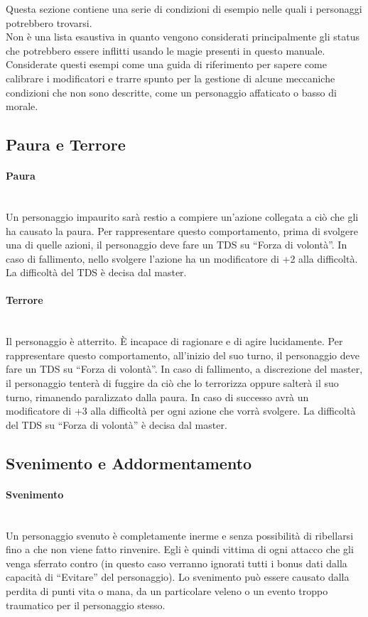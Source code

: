 \documentclass[../manuale_main.tex]{subfiles}
\begin{document}
Questa sezione contiene una serie di condizioni di esempio nelle quali i personaggi potrebbero trovarsi.\\
Non è una lista esaustiva in quanto vengono considerati principalmente gli status che potrebbero essere inflitti usando le magie presenti in questo manuale. Considerate questi esempi come una guida di riferimento per sapere come calibrare i modificatori e trarre spunto per la gestione di alcune meccaniche condizioni che non sono descritte, come un personaggio affaticato o basso di morale.\\

\subsection{Paura e Terrore} 
\paragraph{Paura}\mbox{}\\
Un personaggio impaurito sarà restio a compiere un’azione collegata a ciò che gli ha causato la paura. Per rappresentare questo comportamento, prima di svolgere una di quelle azioni, il personaggio deve fare un TDS su “Forza di volontà”. In caso di fallimento, nello svolgere l’azione ha un modificatore di +2 alla difficoltà. La difficoltà del TDS è decisa dal master.
\paragraph{Terrore}\mbox{}\\
Il personaggio è atterrito. È incapace di ragionare e di agire lucidamente. Per rappresentare questo comportamento, all’inizio del suo turno, il personaggio deve fare un TDS su “Forza di volontà”. In caso di fallimento, a discrezione del master, il personaggio tenterà di fuggire da ciò che lo terrorizza oppure salterà il suo turno, rimanendo paralizzato dalla paura. In caso di successo avrà un modificatore di +3 alla difficoltà per ogni azione che vorrà svolgere. La difficoltà del TDS su “Forza di volontà” è decisa dal master.
\subsection{Svenimento e Addormentamento} 
\paragraph{Svenimento}\mbox{}\\
Un personaggio svenuto è completamente inerme e senza possibilità di ribellarsi fino a che non viene fatto rinvenire. Egli è quindi vittima di ogni attacco che gli venga sferrato contro (in questo caso verranno ignorati tutti i bonus dati dalla capacità di “Evitare” del personaggio). Lo svenimento può essere causato dalla perdita di punti vita o mana, da un particolare veleno o un evento troppo traumatico per il personaggio stesso.
\end{document}
